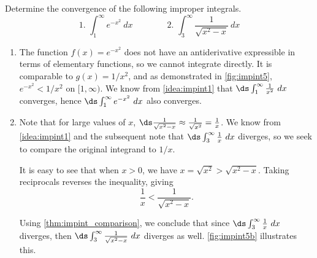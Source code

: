 \begin{example}\label{ex_impint5}
Determine the convergence of the following improper integrals.
\[
 \text{1. }\int_1^\infty e^{-x^2}\ dx\qquad\qquad
 \text{2. }\int_3^\infty \frac{1}{\sqrt{x^2-x}}\ dx
\]
\solution
\begin{enumerate}
\item		The function $f(x) = e^{-x^2}$ does not have an antiderivative expressible in terms of elementary functions, so we cannot integrate directly. It is comparable to $g(x)=1/x^2$, and as demonstrated in \autoref{fig:impint5}, $e^{-x^2} < 1/x^2$ on $[1,\infty)$. We know from \autoref{idea:impint1} that $\ds \int_1^\infty \frac{1}{x^2}\ dx$ converges, hence $\ds\int_1^\infty e^{-x^2}\ dx$ also converges.


\item		Note that for large values of $x$, $\ds \frac{1}{\sqrt{x^2-x}} \approx \frac{1}{\sqrt{x^2}} =\frac{1}{x}$. We know from \autoref{idea:impint1} and the subsequent note that  $\ds \int_3^\infty \frac1x\ dx$ diverges, so we seek to compare the original integrand to $1/x$.

It is easy to see that when $x>0$, we have $x = \sqrt{x^2} > \sqrt{x^2-x}$. Taking reciprocals reverses the inequality, giving
\[\frac1x < \frac1{\sqrt{x^2-x}}.\]

Using \autoref{thm:impint_comparison}, we conclude that since $\ds\int_3^\infty\frac1x\ dx$ diverges, then $\ds\int_3^\infty\frac1{\sqrt{x^2-x}}\ dx$ diverges as well. \autoref{fig:impint5b} illustrates this.


\end{enumerate}
\end{example}
